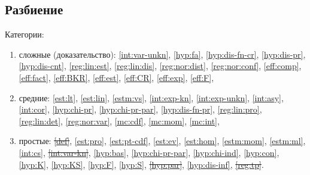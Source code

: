 \documentclass[a4paper,12pt]{article}
\begin{document}
    \subsection{Разбиение}
    Категории:
    \begin{enumerate}
        \item сложные (доказательство):
              \ref{int:var-unkn},
              \ref{hyp:fa},
              \ref{hyp:dis-fn-cr},
              \ref{hyp:dis-pr},
              \ref{hyp:dis-cnt},
              \ref{reg:lin:est},
              \ref{reg:lin:dis},
              \ref{reg:nor:dist},
              \ref{reg:nor:conf},
              \ref{eff:comp},
              \ref{eff:fact},
              \ref{eff:BKR},
              \ref{eff:est},
              \ref{eff:CR},
              \ref{eff:exp},
              \ref{eff:F},

        \item средние:
              \ref{est:lt},
              \ref{est:lin},
              \ref{estm:vs},
              \ref{int:exp-kn},
              \ref{int:exp-unkn},
              \ref{int:asy},
              \ref{int:cor},
              \ref{hyp:chi-pr},
              \ref{hyp:chi-pr-par},
              \ref{hyp:dis-fn-pr},
              \ref{reg:lin:pro},
              \ref{reg:lin:det},
              \ref{reg:nor:var},
              \ref{mc:cdf},
              \ref{mc:mom},
              \ref{mc:int},

        \item простые:
              \sout{\ref{def}},
              \ref{est:pro},
              \ref{est:pt-cdf},
              \ref{est:ev},
              \ref{est:hom},
              \ref{estm:mom},
              \ref{estm:ml},
              \ref{int:cs},
              \sout{\ref{int:var-kn}},
              \ref{hyp:bas},
              \ref{hyp:chi-pr-par},
              \ref{hyp:chi-ind},
              \ref{hyp:con},
              \ref{hyp:K},
              \ref{hyp:KS},
              \ref{hyp:F},
              \ref{hyp:S},
              \sout{\ref{hyp:par}},
              \ref{hyp:dis-inf},
              \sout{\ref{reg:tp}}.
    \end{enumerate}
\end{document}

